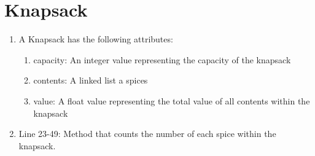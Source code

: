 \documentclass[letterpaper, 10pt,DIV=13]{scrartcl}
\numberwithin{equation}{section} %
\numberwithin{figure}{section} %
\numberwithin{table}{section} %
\begin{document}
\section{Knapsack}
\begin{enumerate}
    \item A Knapsack has the following attributes:
    \begin{enumerate}
        \item capacity: An integer value representing the capacity of the knapsack
        \item contents: A linked list a spices
        \item value: A float value representing the total value of all contents within the knapsack
    \end{enumerate}
    \item Line 23-49: Method that counts the number of each spice within the knapsack.
\end{enumerate}
\end{document}
